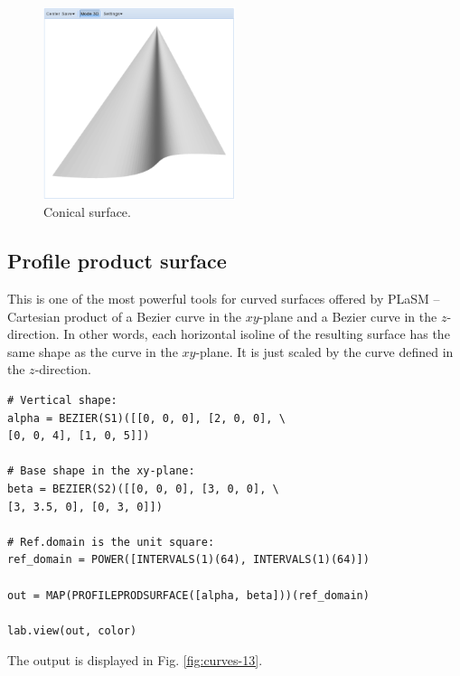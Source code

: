 \documentclass[article,A4,12pt]{llncs}
\begin{document}
\begin{figure}[!ht]
\begin{center}
\includegraphics[width=0.5\textwidth]{img/curves-12.png}
\end{center}
\vspace{-2mm}
\caption{Conical surface.}
\label{fig:curves-12}
\end{figure}



\subsection{Profile product surface}

This is one of the most powerful tools for curved surfaces offered by PLaSM --
Cartesian product of a Bezier curve in the $xy$-plane and a Bezier curve 
in the $z$-direction. In other words, each horizontal isoline of the resulting 
surface has the same shape as the curve in the $xy$-plane. It is just scaled by 
the curve defined in the $z$-direction.

\begin{verbatim}
# Vertical shape:
alpha = BEZIER(S1)([[0, 0, 0], [2, 0, 0], \
[0, 0, 4], [1, 0, 5]])

# Base shape in the xy-plane:
beta = BEZIER(S2)([[0, 0, 0], [3, 0, 0], \
[3, 3.5, 0], [0, 3, 0]])

# Ref.domain is the unit square:
ref_domain = POWER([INTERVALS(1)(64), INTERVALS(1)(64)])

out = MAP(PROFILEPRODSURFACE([alpha, beta]))(ref_domain)
 
lab.view(out, color)
\end{verbatim}
The output is displayed in Fig. \ref{fig:curves-13}.
\end{document}
